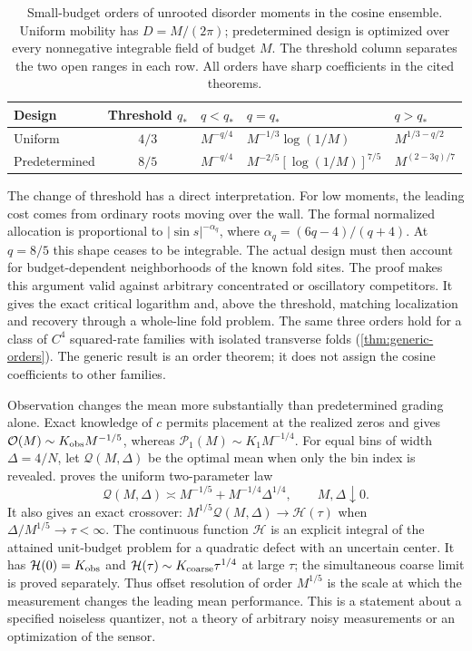 \begin{table}[t]
\centering
\caption{Small-budget orders of unrooted disorder moments in the cosine
ensemble. Uniform mobility has $D=M/(2\pi)$; predetermined design is
optimized over every nonnegative integrable field of budget $M$.
The threshold column separates the two open ranges in each row.
All orders have sharp coefficients in the cited theorems.}
\label{tab:regimes}
\renewcommand{\arraystretch}{1.25}
\begin{tabular}{@{}lclll@{}}
\toprule
Design & Threshold $q_*$ & $q<q_*$ & $q=q_*$ & $q>q_*$\\
\midrule
Uniform & $4/3$ & $M^{-q/4}$ & $M^{-1/3}\log(1/M)$
 & $M^{1/3-q/2}$\\
Predetermined & $8/5$ & $M^{-q/4}$
 & $M^{-2/5}[\log(1/M)]^{7/5}$ & $M^{(2-3q)/7}$\\
\bottomrule
\end{tabular}
\end{table}

The change of threshold has a direct interpretation. For low moments,
the leading cost comes from ordinary roots moving over the wall. The
formal normalized allocation is proportional to
$|\sin s|^{-\alpha_q}$, where $\alpha_q=(6q-4)/(q+4)$.
At $q=8/5$ this shape ceases to be integrable. The actual design must
then account for budget-dependent neighborhoods of the known fold sites.
The proof makes this argument valid against arbitrary concentrated or
oscillatory competitors. It gives the exact critical logarithm and,
above the threshold, matching localization and recovery through a
whole-line fold problem. The same three orders hold for a class of
$C^4$ squared-rate families with isolated transverse folds
(\cref{thm:generic-orders}). The generic result is an order theorem;
it does not assign the cosine coefficients to other families.

Observation changes the mean more substantially than predetermined
grading alone. Exact knowledge of $c$ permits placement at the realized
zeros and gives
$\mathcal O(M)\sim K_{\rm obs}M^{-1/5}$, whereas
$\mathcal P_1(M)\sim K_1M^{-1/4}$.
For equal bins of width $\Delta=4/N$, let $\mathcal Q(M,\Delta)$
be the optimal mean when only the bin index is revealed.
 proves the uniform two-parameter law
\[
 \mathcal Q(M,\Delta)\asymp
          M^{-1/5}+M^{-1/4}\Delta^{1/4},\qquad M,\Delta\downarrow0.
\]
It also gives an exact crossover:
$M^{1/5}\mathcal Q(M,\Delta)\to\mathcal H(\tau)$ when
$\Delta/M^{1/5}\to\tau<\infty$. The continuous function
$\mathcal H$ is an explicit integral of the attained unit-budget
problem for a quadratic defect with an uncertain center.
It has $\mathcal H(0)=K_{\rm obs}$ and
$\mathcal H(\tau)\sim K_{\rm coarse}\tau^{1/4}$ at large $\tau$;
the simultaneous coarse limit is proved separately.
Thus offset resolution of order $M^{1/5}$ is the scale at which the
measurement changes the leading mean performance. This is a statement
about a specified noiseless quantizer, not a theory of arbitrary noisy
measurements or an optimization of the sensor.

